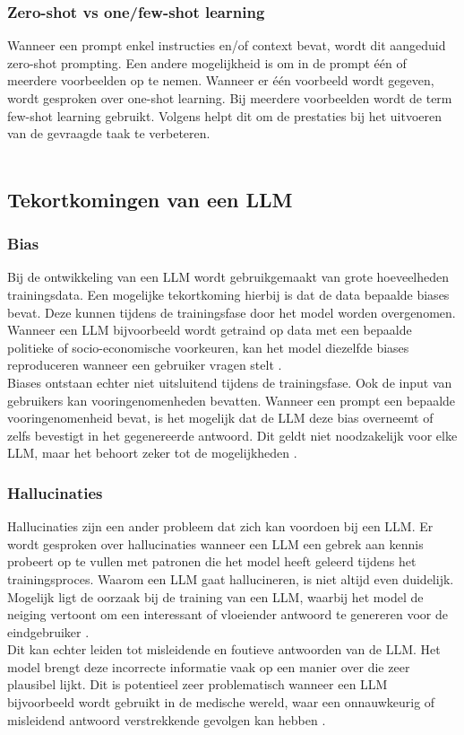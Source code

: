 \subsubsection{Zero-shot vs one/few-shot learning}

Wanneer een prompt enkel instructies en/of context bevat, wordt dit aangeduid zero-shot prompting. Een andere mogelijkheid is om in de prompt één of meerdere voorbeelden op te nemen. Wanneer er één voorbeeld wordt gegeven, wordt gesproken over one-shot learning. Bij meerdere voorbeelden wordt de term few-shot learning gebruikt. Volgens \textcite{Marvin2024} helpt dit om de prestaties bij het uitvoeren van de gevraagde taak te verbeteren.
\\[1em]
\\
\subsection{Tekortkomingen van een LLM}

\subsubsection{Bias}
Bij de ontwikkeling van een LLM wordt gebruikgemaakt van grote hoeveelheden trainingsdata. Een mogelijke tekortkoming hierbij is dat de data bepaalde biases bevat. Deze kunnen tijdens de trainingsfase door het model worden overgenomen. Wanneer een LLM bijvoorbeeld wordt getraind op data met een bepaalde politieke of socio-economische voorkeuren, kan het model diezelfde biases reproduceren wanneer een gebruiker vragen stelt \autocite{Hadi2023}.
\\[1em]
Biases ontstaan echter niet uitsluitend tijdens de trainingsfase. Ook de input van gebruikers kan vooringenomenheden bevatten. Wanneer een prompt een bepaalde vooringenomenheid bevat, is het mogelijk dat de LLM deze bias overneemt of zelfs bevestigt in het gegenereerde antwoord. Dit geldt niet noodzakelijk voor elke LLM, maar het behoort zeker tot de mogelijkheden \autocite{Hadi2023}.

\subsubsection{Hallucinaties}
Hallucinaties zijn een ander probleem dat zich kan voordoen bij een LLM. Er wordt gesproken over hallucinaties wanneer een LLM een gebrek aan kennis probeert op te vullen met patronen die het model heeft geleerd tijdens het trainingsproces. Waarom een LLM gaat hallucineren, is niet altijd even duidelijk. Mogelijk ligt de oorzaak bij de training van een LLM, waarbij het model de neiging vertoont om een interessant of vloeiender antwoord te genereren voor de eindgebruiker \autocite{Hadi2023}.
\\[1em]
Dit kan echter leiden tot misleidende en foutieve antwoorden van de LLM. Het model brengt deze incorrecte informatie vaak op een manier over die zeer plausibel lijkt. Dit is potentieel zeer problematisch wanneer een LLM bijvoorbeeld wordt gebruikt in de medische wereld, waar een onnauwkeurig of misleidend antwoord verstrekkende gevolgen kan hebben \autocite{Ji2023}.

